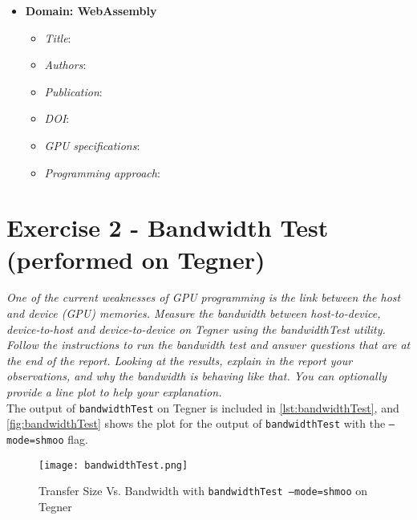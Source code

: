 \documentclass[12pt]{article}
\begin{document}
\begin{enumerate}
\begin{itemize}
        \item \textbf{Domain: WebAssembly}
        \begin{itemize}
            \item \textit{Title}:
            \item \textit{Authors}:
            \item \textit{Publication}:
            \item \textit{DOI}:
            \item \textit{GPU specifications}:
            \item \textit{Programming approach}:
        \end{itemize}
    \end{itemize}
\end{enumerate}

\section{Exercise 2 - Bandwidth Test (performed on Tegner)}
\textit{One of the current weaknesses of GPU programming is the link between the host and device (GPU) memories. Measure the bandwidth between host-to-device, device-to-host and device-to-device on Tegner using the bandwidthTest utility. Follow the instructions to run the bandwidth test and answer questions that are at the end of the report. Looking at the results, explain in the report your observations, and why the bandwidth is behaving like that. You can optionally provide a line plot to help your explanation.}\\


The output of \texttt{bandwidthTest} on Tegner is included in \autoref{lst:bandwidthTest}, and \autoref{fig:bandwidthTest} shows the plot for the output of \texttt{bandwidthTest} with the \texttt{--mode=shmoo} flag.

\begin{figure}[H]
\centering
\texttt{[image: bandwidthTest.png]}
\caption{Transfer Size Vs. Bandwidth with \texttt{bandwidthTest --mode=shmoo} on Tegner}
\label{fig:bandwidthTest}
\end{figure}
\end{document}
